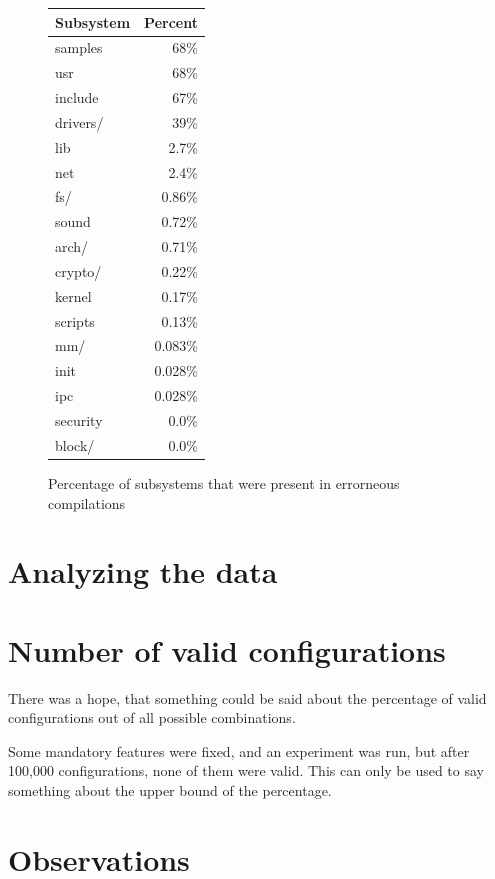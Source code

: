 \documentclass[a4paper,11pt]{report}
\newcommand{\figa}{
    \begin{figure}[!htpb]
    \centering
}
\newcommand{\figb}[2]{
    \caption{#1}
    \label{#2}
    \end{figure}
}
\begin{document}
\figa
    \begin{tabular}{l|r}
        \hline
        \hline
        \textbf{Subsystem} & \textbf{Percent} \\
        \hline
        
        samples & 68\%\\
        usr     & 68\%\\
        include & 67\%\\
        drivers/    &   39\% \\
        lib     & 2.7\%\\
        net     & 2.4\%\\
        fs/         & 0.86\% \\
        sound   & 0.72\%\\
        arch/   & 0.71\%\\
        crypto/ & 0.22\%\\
        kernel  & 0.17\%\\
        scripts & 0.13\%\\
        mm/ & 0.083\% \\
        init    & 0.028\%\\
        ipc     & 0.028\%\\
        security & 0.0\%\\
        block/  & 0.0\%\\

        \hline
        \hline
        
    \end{tabular}
\figb{Percentage of subsystems that were present in errorneous compilations}{}


\section{Analyzing the data}


    \section{Number of valid configurations}

There was a hope, that something could be said about the percentage of valid 
configurations out of all possible combinations.

Some mandatory features were fixed, and an experiment was run, but after 100,000
configurations, none of them were valid. This can only be used to say something
about the upper bound of the percentage.


\section{Observations}
\end{document}
